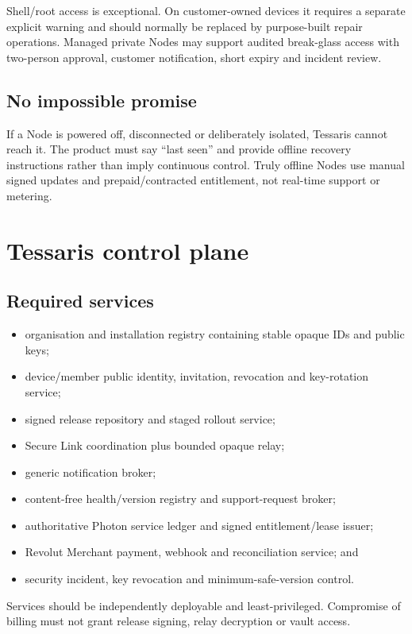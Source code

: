 \documentclass[11pt]{article}
\begin{document}
Shell/root access is exceptional. On customer-owned devices it requires a separate explicit warning and should normally be replaced by purpose-built repair operations. Managed private Nodes may support audited break-glass access with two-person approval, customer notification, short expiry and incident review.

\subsection{No impossible promise}

If a Node is powered off, disconnected or deliberately isolated, Tessaris cannot reach it. The product must say ``last seen'' and provide offline recovery instructions rather than imply continuous control. Truly offline Nodes use manual signed updates and prepaid/contracted entitlement, not real-time support or metering.

\section{Tessaris control plane}

\subsection{Required services}

\begin{itemize}
  \item organisation and installation registry containing stable opaque IDs and public keys;
  \item device/member public identity, invitation, revocation and key-rotation service;
  \item signed release repository and staged rollout service;
  \item Secure Link coordination plus bounded opaque relay;
  \item generic notification broker;
  \item content-free health/version registry and support-request broker;
  \item authoritative Photon service ledger and signed entitlement/lease issuer;
  \item Revolut Merchant payment, webhook and reconciliation service; and
  \item security incident, key revocation and minimum-safe-version control.
\end{itemize}

Services should be independently deployable and least-privileged. Compromise of billing must not grant release signing, relay decryption or vault access.
\end{document}
